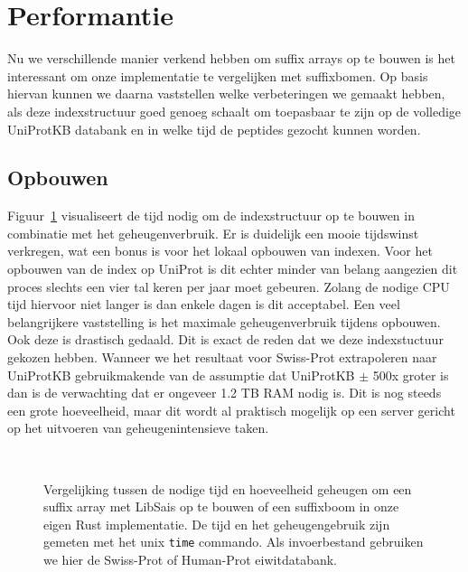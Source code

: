 \section{Performantie}\label{sec:performantie}
Nu we verschillende manier verkend hebben om suffix arrays op te bouwen is het interessant om onze implementatie te vergelijken met suffixbomen.
Op basis hiervan kunnen we daarna vaststellen welke verbeteringen we gemaakt hebben, als deze indexstructuur goed genoeg schaalt om toepasbaar te zijn op de volledige UniProtKB databank en in welke tijd de peptides gezocht kunnen worden.

\subsection{Opbouwen}
Figuur~\ref{fig:array_building} visualiseert de tijd nodig om de indexstructuur op te bouwen in combinatie met het geheugenverbruik.
Er is duidelijk een mooie tijdswinst verkregen, wat een bonus is voor het lokaal opbouwen van indexen.
Voor het opbouwen van de index op UniProt is dit echter minder van belang aangezien dit proces slechts een vier tal keren per jaar moet gebeuren.
Zolang de nodige CPU tijd hiervoor niet langer is dan enkele dagen is dit acceptabel.
Een veel belangrijkere vaststelling is het maximale geheugenverbruik tijdens opbouwen.
Ook deze is drastisch gedaald.
Dit is exact de reden dat we deze indexstuctuur gekozen hebben.
Wanneer we het resultaat voor Swiss-Prot extrapoleren naar UniProtKB gebruikmakende van de assumptie dat UniProtKB $\pm$ 500x groter is dan is de verwachting dat er ongeveer 1.2 TB RAM nodig is.
Dit is nog steeds een grote hoeveelheid, maar dit wordt al praktisch mogelijk op een server gericht op het uitvoeren van geheugenintensieve taken.

\begin{figure}[H]
    \centering
    \\[4ex] %

    \caption{Vergelijking tussen de nodige tijd en hoeveelheid geheugen om een suffix array met LibSais op te bouwen of een suffixboom in onze eigen Rust implementatie. De tijd en het geheugengebruik zijn gemeten met het unix \texttt{time} commando. Als invoerbestand gebruiken we hier de Swiss-Prot of Human-Prot eiwitdatabank.}\label{fig:array_building}
\end{figure}

